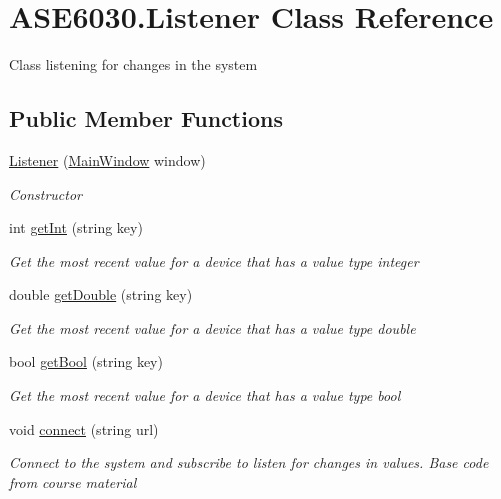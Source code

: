 \hypertarget{class_a_s_e6030_1_1_listener}{}\section{A\+S\+E6030.\+Listener Class Reference}
\label{class_a_s_e6030_1_1_listener}


Class listening for changes in the system  


\subsection*{Public Member Functions}
\begin{DoxyCompactItemize}
\item 
\hyperlink{class_a_s_e6030_1_1_listener_af7626538cc99c4945ea517dbf6eaa249}{Listener} (\hyperlink{class_a_s_e6030_1_1_main_window}{Main\+Window} window)
\begin{DoxyCompactList}\small\item\em Constructor \end{DoxyCompactList}\item 
int \hyperlink{class_a_s_e6030_1_1_listener_a7f82d12db6e97dd86f78dc2f62b23214}{get\+Int} (string key)
\begin{DoxyCompactList}\small\item\em Get the most recent value for a device that has a value type integer \end{DoxyCompactList}\item 
double \hyperlink{class_a_s_e6030_1_1_listener_af8474a0fcd293043899a51cbb3e05d44}{get\+Double} (string key)
\begin{DoxyCompactList}\small\item\em Get the most recent value for a device that has a value type double \end{DoxyCompactList}\item 
bool \hyperlink{class_a_s_e6030_1_1_listener_ac6b8dbf1ed6fd6c3ce0911beef9759ce}{get\+Bool} (string key)
\begin{DoxyCompactList}\small\item\em Get the most recent value for a device that has a value type bool \end{DoxyCompactList}\item 
void \hyperlink{class_a_s_e6030_1_1_listener_a8da1c65da8448e79897a2c06c31e6ca0}{connect} (string url)
\begin{DoxyCompactList}\small\item\em Connect to the system and subscribe to listen for changes in values. Base code from course material \end{DoxyCompactList}\end{DoxyCompactItemize}


